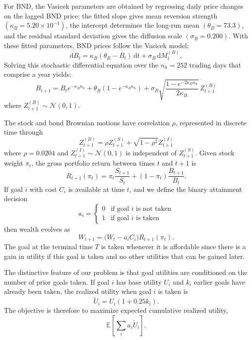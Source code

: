 \documentclass[mnsc,sglanonrev]{informs4}
\begin{document}
For BND, the Vasicek
parameters are obtained by regressing daily price changes on the lagged BND
price; the fitted slope gives mean reversion strength $(\kappa_B=5.20\times10^{-4})$, the intercept determines the
long-run mean $(\theta_B=73.3)$, and the residual standard deviation gives the diffusion scale $(\sigma_B=0.200)$. With these fitted parameters, BND prices follow the
Vasicek model:
\[
  \mathrm{d}B_t=\kappa_B(\theta_B-B_t)\,\mathrm{d}t+\sigma_B\,\mathrm{d}M^{(B)}_t,
\]
Solving this stochastic differential equation over the $n_h=252$ trading days that comprise a year yields:
$$
  B_{t+1}=  B_t e^{-\kappa_B n_h}+\theta_B(1-e^{-\kappa_B n_h}) +\sigma_B\sqrt{\frac{1-e^{-2\kappa_B n_h}}{2\kappa_B}}\,Z^{(B)}_{t+1}$$
where $Z^{(B)}_{t+1}\sim\mathcal{N}(0,1)$.

The stock and bond Brownian motions have correlation $\rho$, represented in discrete time through
\[
  Z^{(B)}_{t+1}=\rho Z^{(S)}_{t+1}+\sqrt{1-\rho^2}Z^{(I)}_{t+1}
\]
where $\rho=0.0204$ and $Z^{(I)}_{t+1}\sim\mathcal{N}(0,1)$ is independent of $Z^{(S)}_{t+1}$. Given stock weight $\pi_t$, the gross portfolio return between times $t$ and $t+1$ is
\[
  R_{t+1}(\pi_t)=\pi_t\frac{S_{t+1}}{S_t}+(1-\pi_t)\frac{B_{t+1}}{B_t}.
\]
If goal $i$ with cost $C_i$ is available at time $t$, and we define the binary attainment decision
$$  a_i=
\left\{
\begin{array}{ll}
0  &\mbox{if goal $i$ is not taken} \\ 
1    &\mbox{if goal $i$ is taken}
\end{array}
\right.  $$
then wealth evolves as
\[
  W_{t+1}=\bigl(W_t-a_iC_i\bigr)R_{t+1}(\pi_t).
\]
The goal at the terminal time $T$ is taken whenever it is affordable since there is a gain in utility if this goal is taken and no other utilities that can be gained later.

The distinctive feature of our problem is that goal utilities are conditioned on the number of prior goals taken. If goal $i$ has base utility $U_i$ and $k_i$ earlier goals have
already been taken, the realized utility when goal $i$ is taken is
\[
  \widetilde U_i = U_i(1+0.25k_i).
\]
The objective is therefore to maximize expected cumulative realized utility,
\[
  \mathbb{E}\left[\sum_i a_i \widetilde U_i\right].
\]
\end{document}
